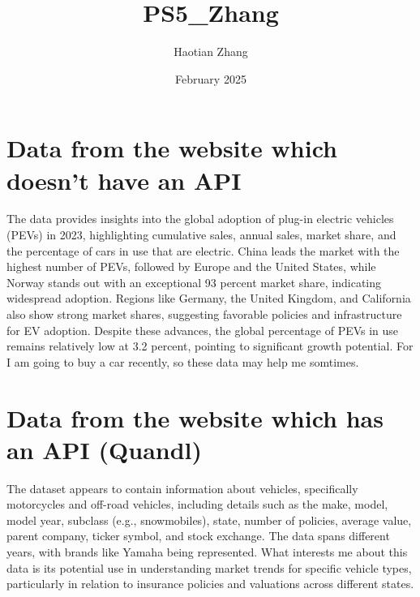 \documentclass{article}
\title{PS5_Zhang}
\author{Haotian Zhang}
\date{February 2025}
\begin{document}
 

\maketitle 

\section{Data from the website which doesn't have an API} The data provides insights into the global adoption of 
plug-in electric vehicles (PEVs) in 2023, highlighting cumulative sales, 
annual sales, market share, and the percentage of cars in use that are 
electric. China leads the market with the highest number of PEVs, 
followed by Europe and the United States, while Norway stands out with 
an exceptional 93 percent market share, indicating widespread adoption. 
Regions like Germany, the United Kingdom, and California also show 
strong market shares, suggesting favorable policies and infrastructure 
for EV adoption. Despite these advances, the global percentage of PEVs 
in use remains relatively low at 3.2 percent, pointing to significant 
growth potential. For I am going to buy a car recently, so these data 
may help me somtimes. 

\section{Data from the website which has an API (Quandl)} The dataset appears to contain information about vehicles, 
specifically motorcycles and off-road vehicles, including details such 
as the make, model, model year, subclass (e.g., snowmobiles), state, 
number of policies, average value, parent company, ticker symbol, and 
stock exchange. The data spans different years, with brands like Yamaha 
being represented. What interests me about this data is its potential 
use in understanding market trends for specific vehicle types, 
particularly in relation to insurance policies and valuations across 
different states.
\end{document}

